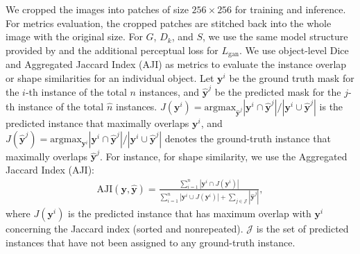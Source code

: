 \documentclass[letterpaper]{article} %
\begin{document}
We cropped the images into patches of size $256 \times 256$ for training and inference. For metrics evaluation, the cropped patches are stitched back into the whole image with the original size. For $G$, $D_k$, and $S$,  we use the same model structure provided by \cite{chang2020synthetic} and the additional perceptual loss \cite{johnson2016perceptual} for $L_\text{gan}$.
We use object-level Dice \cite{chen2016dcan} and Aggregated Jaccard Index (AJI) \cite{vu2019methods} as metrics to evaluate the instance overlap or shape similarities for an individual object. Let $\bm{y}^i$ be the ground truth mask for the $i$-th instance of the total $n$ instances, and $\hat{\bm{y}}^j$ be the predicted mask for the $j$-th instance of the total $\hat{n}$ instances. %
$J(\bm{y}^i)= \text{argmax}_{\hat{\bm{y}}^j} {|\bm{y}^i \cap \hat{\bm{y}}^j|} / {|\bm{y}^i \cup \hat{\bm{y}}^j|}$ is the predicted instance that maximally overlaps $\bm{y}^i$, and $J(\hat{\bm{y}}^j)= \text{argmax}_{\bm{y}^i} {|\bm{y}^i \cap \hat{\bm{y}}^j|} / {|\bm{y}^i \cup \hat{\bm{y}}^j|}$ denotes the ground-truth instance that maximally overlaps $\hat{\bm{y}}^j$. 
For instance, for shape similarity, we use the Aggregated Jaccard Index (AJI): 
\begin{equation}
\label{eq:aji}
\begin{aligned}
    \text{AJI} (\bm{y}, \hat{\bm{y}})= \frac{\sum_{i=1}^{n} | \bm{y}^i \cap J(\bm{y}^i)| }{ \sum_{i=1}^{n} | \bm{y}^i \cup J(\bm{y}^i)| + \sum_{j \in \mathcal{J}} |\hat{\bm{y}}^j|},
\end{aligned}
\end{equation}
where $J(\bm{y}^i)$ is the predicted instance that has maximum overlap with $\bm{y}^i$ concerning the Jaccard index (sorted and nonrepeated). $\mathcal{J}$ is the set of predicted instances that have not been assigned to any ground-truth instance.
\end{document}
